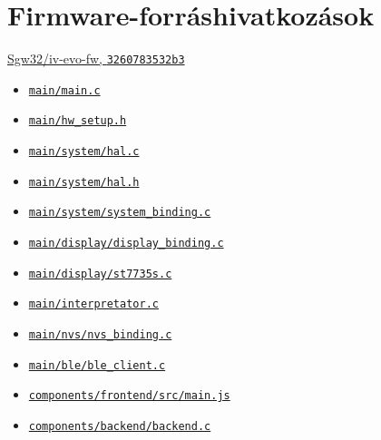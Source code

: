 \section{Firmware-forráshivatkozások}
\href{https://github.com/Sgw32/iv-evo-fw/tree/3260783532b3d4ad8529b23f4e907c0a6ab03262}{Sgw32/iv-evo-fw, \texttt{3260783532b3}}
\begin{itemize}
\item \href{https://github.com/Sgw32/iv-evo-fw/blob/3260783532b3d4ad8529b23f4e907c0a6ab03262/main/main.c}{\nolinkurl{main/main.c}}
\item \href{https://github.com/Sgw32/iv-evo-fw/blob/3260783532b3d4ad8529b23f4e907c0a6ab03262/main/hw_setup.h}{\nolinkurl{main/hw_setup.h}}
\item \href{https://github.com/Sgw32/iv-evo-fw/blob/3260783532b3d4ad8529b23f4e907c0a6ab03262/main/system/hal.c}{\nolinkurl{main/system/hal.c}}
\item \href{https://github.com/Sgw32/iv-evo-fw/blob/3260783532b3d4ad8529b23f4e907c0a6ab03262/main/system/hal.h}{\nolinkurl{main/system/hal.h}}
\item \href{https://github.com/Sgw32/iv-evo-fw/blob/3260783532b3d4ad8529b23f4e907c0a6ab03262/main/system/system_binding.c}{\nolinkurl{main/system/system_binding.c}}
\item \href{https://github.com/Sgw32/iv-evo-fw/blob/3260783532b3d4ad8529b23f4e907c0a6ab03262/main/display/display_binding.c}{\nolinkurl{main/display/display_binding.c}}
\item \href{https://github.com/Sgw32/iv-evo-fw/blob/3260783532b3d4ad8529b23f4e907c0a6ab03262/main/display/st7735s.c}{\nolinkurl{main/display/st7735s.c}}
\item \href{https://github.com/Sgw32/iv-evo-fw/blob/3260783532b3d4ad8529b23f4e907c0a6ab03262/main/interpretator.c}{\nolinkurl{main/interpretator.c}}
\item \href{https://github.com/Sgw32/iv-evo-fw/blob/3260783532b3d4ad8529b23f4e907c0a6ab03262/main/nvs/nvs_binding.c}{\nolinkurl{main/nvs/nvs_binding.c}}
\item \href{https://github.com/Sgw32/iv-evo-fw/blob/3260783532b3d4ad8529b23f4e907c0a6ab03262/main/ble/ble_client.c}{\nolinkurl{main/ble/ble_client.c}}
\item \href{https://github.com/Sgw32/iv-evo-fw/blob/3260783532b3d4ad8529b23f4e907c0a6ab03262/components/frontend/src/main.js}{\nolinkurl{components/frontend/src/main.js}}
\item \href{https://github.com/Sgw32/iv-evo-fw/blob/3260783532b3d4ad8529b23f4e907c0a6ab03262/components/backend/backend.c}{\nolinkurl{components/backend/backend.c}}

\end{itemize}
